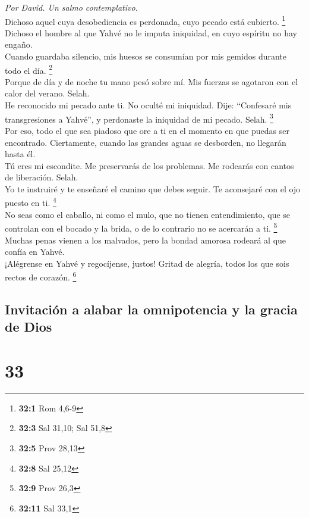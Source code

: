 \emph{Por David. Un salmo contemplativo.}\\
 Dichoso aquel cuya desobediencia es perdonada, cuyo
pecado está cubierto. \footnote{\textbf{32:1} Rom 4,6-9}\\
 Dichoso el hombre al que Yahvé no le imputa iniquidad, en
cuyo espíritu no hay engaño.\\
 Cuando guardaba silencio, mis huesos se consumían por mis
gemidos durante todo el día. \footnote{\textbf{32:3} Sal 31,10; Sal 51,8}\\
 Porque de día y de noche tu mano pesó sobre mí. Mis
fuerzas se agotaron con el calor del verano. Selah.\\
 He reconocido mi pecado ante ti. No oculté mi iniquidad.
Dije: ``Confesaré mis transgresiones a Yahvé'', y perdonaste la
iniquidad de mi pecado. Selah. \footnote{\textbf{32:5} Prov 28,13}\\
 Por eso, todo el que sea piadoso que ore a ti en el
momento en que puedas ser encontrado. Ciertamente, cuando las grandes
aguas se desborden, no llegarán hasta él.\\
 Tú eres mi escondite. Me preservarás de los problemas. Me
rodearás con cantos de liberación. Selah.\\
 Yo te instruiré y te enseñaré el camino que debes seguir.
Te aconsejaré con el ojo puesto en ti. \footnote{\textbf{32:8} Sal 25,12}\\
 No seas como el caballo, ni como el mulo, que no tienen
entendimiento, que se controlan con el bocado y la brida, o de lo
contrario no se acercarán a ti. \footnote{\textbf{32:9} Prov 26,3}\\
 Muchas penas vienen a los malvados, pero la bondad
amorosa rodeará al que confía en Yahvé.\\
 ¡Alégrense en Yahvé y regocíjense, justos! Gritad de
alegría, todos los que sois rectos de corazón. \footnote{\textbf{32:11}
  Sal 33,1}

\hypertarget{invitaciuxf3n-a-alabar-la-omnipotencia-y-la-gracia-de-dios}{%
\subsection{Invitación a alabar la omnipotencia y la gracia de
Dios}\label{invitaciuxf3n-a-alabar-la-omnipotencia-y-la-gracia-de-dios}}

\hypertarget{section-32}{%
\section{33}\label{section-32}}

